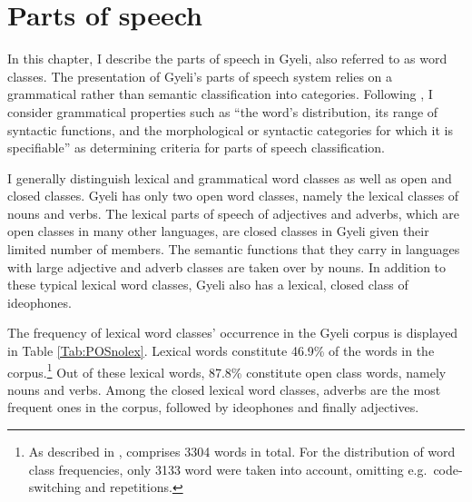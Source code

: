 \chapter{Parts of speech}
\label{sec:POS}


In this chapter, I describe the parts of speech in Gyeli, also referred to as word classes. The presentation of Gyeli's parts of speech system relies on a grammatical rather than semantic classification into categories. Following \citet[1-2]{schachter2007}, I consider grammatical properties such as ``the word’s distribution, its range of syntactic functions, and the morphological or syntactic categories for which it is specifiable'' as determining criteria for parts of speech classification. 

I generally distinguish lexical and grammatical word classes as well as open and closed classes.
Gyeli has only two open word classes, namely the lexical classes of nouns and verbs. The lexical parts of speech of adjectives and adverbs, which are open classes in many other languages, are closed classes in Gyeli given their limited number of members. The semantic functions that they carry in languages with large adjective and adverb classes are taken over by nouns. In addition to these typical lexical word classes, Gyeli also has a lexical, closed class of ideophones. 

The frequency of lexical word classes' occurrence in the Gyeli corpus is displayed in Table \ref{Tab:POSnolex}. Lexical words constitute 46.9\% of the words in the corpus.\footnote{As described in , comprises 3304 words in total. For the distribution of word class frequencies, only 3133 word were taken into account, omitting e.g.\ code-switching and repetitions.} Out of these lexical words, 87.8\% constitute open class words, namely nouns and verbs. Among the closed lexical word classes, adverbs are the most frequent ones in the corpus, followed by ideophones and finally adjectives.

